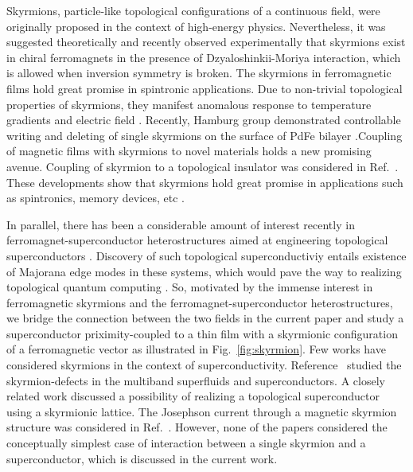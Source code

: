 \documentclass[twocolumn,showpacs,floatfix,longbibliography]{revtex4-1}
\begin{document}
Skyrmions, particle-like topological configurations of a continuous field, were originally proposed in the context of high-energy physics.  Nevertheless, it was suggested theoretically \cite{Bogdanov1989,Rossler2006} and recently observed experimentally \cite{Muhlbauer2009,Munzer2010,Yu2011,Heinze2011,Seki2012} that skyrmions exist in chiral ferromagnets in the presence of Dzyaloshinkii-Moriya interaction, which is allowed when inversion symmetry is broken. The skyrmions in ferromagnetic films hold great promise in spintronic applications. Due to non-trivial topological properties of skyrmions, they manifest anomalous response to temperature gradients \cite{Jonietz2010} and electric field \cite{Neubauer2009}. Recently, Hamburg group demonstrated  controllable writing and deleting of single skyrmions on the surface of PdFe bilayer \cite{Romming2013,Bergmann2014,Romming2015}.Coupling of magnetic films with skyrmions to novel materials holds a new promising avenue.  Coupling of skyrmion to a topological insulator was considered in Ref.~\cite{Hurst2015}. These developments show that skyrmions hold great promise in applications such as spintronics, memory devices, etc \cite{Fert2013,Nagaosa2013}. 

In parallel, there has been a considerable amount of interest recently in ferromagnet-superconductor heterostructures aimed at engineering topological superconductors \cite{Alicea2012}. Discovery of such topological superconductiviy entails existence of Majorana edge modes in these systems, which would pave the way to realizing topological quantum computing \cite{Nayak2008}. So, motivated by the immense interest in ferromagnetic skyrmions and the ferromagnet-superconductor heterostructures, we bridge the connection between the two fields in the current paper and study a superconductor priximity-coupled to a thin film with a skyrmionic configuration of a ferromagnetic vector as illustrated in Fig.~\ref{fig:skyrmion}. Few works have considered skyrmions in the context of superconductivity. Reference~\cite{Garaud2011} studied the skyrmion-defects in the multiband superfluids and superconductors. A closely related work \cite{Nakosai2013} discussed a possibility of realizing a topological superconductor using a skyrmionic lattice. The Josephson current through a magnetic skyrmion structure was considered in Ref.~\cite{Yokoyama2015}. However, none of the papers considered the conceptually simplest case of interaction between a single skyrmion and a superconductor, which is discussed in the current work.
\end{document}
